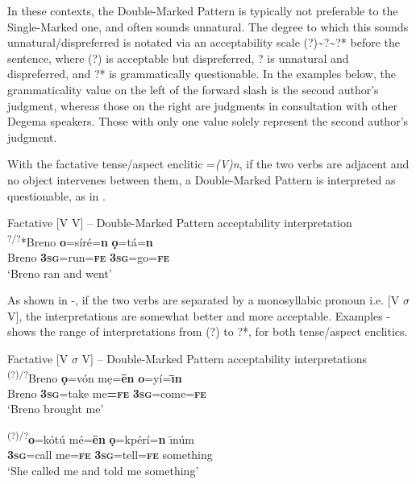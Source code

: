 \documentclass[output=paper]{langsci/langscibook}
\begin{document}
In these contexts, the Double-Marked Pattern is typically not preferable to the Single-Marked one, and often sounds unnatural. The degree to which this sounds unnatural/dispreferred is notated via an acceptability scale (?){\textasciitilde}?{\textasciitilde}?* before the sentence, where (?) is acceptable but dispreferred, ? is unnatural and dispreferred, and ?* is grammatically questionable. In the examples below, the grammaticality value on the left of the forward slash is the second author’s judgment, whereas those on the right are judgments in consultation with other Degema speakers. Those with only one value solely represent the second author’s judgment.

With the factative tense/aspect enclitic =\textit{(V)n}, if the two verbs are adjacent and no object intervenes between them, a Double-Marked Pattern is interpreted as questionable, as in . 

\ea\label{ex:rolle:23}
{Factative [V V] – Double-Marked Pattern acceptability interpretation}\\
\gll  \textsuperscript{?/?}*Breno   \textbf{o}=síré=\textbf{n}     \textbf{ọ}=tá=\textbf{n}\\
     Breno  \textbf{\textsc{3sg}}=run=\textbf{\textsc{fe}}    \textbf{\textsc{3sg}}=go=\textbf{\textsc{fe}}\\
\glt ‘Breno ran and went’
\z

As shown in -, if the two verbs are separated by a monosyllabic pronoun i.e. [V $\sigma $ V], the interpretations are somewhat better and more acceptable. Examples - shows the range of interpretations from (?) to ?*, for both tense/aspect enclitics.



\ea\label{ex:rolle:24}
{Factative [V $\sigma $ V] – Double-Marked Pattern acceptability interpretations} \\
  \ea 
\gll   \textsuperscript{(?)/?}Breno  \textbf{ọ}=vón  mẹ=\textbf{\=en}  \textbf{o}=yí=\textbf{\={\i}n}\\
         Breno  \textbf{\textsc{3}\textsc{sg}}=take  me\textbf{=}\textbf{\textsc{fe}} \textbf{\textsc{3sg}}=come=\textbf{\textsc{fe}}\\
\glt ‘Breno brought me’

\ex\label{ex:rolle:25}
\gll   \textsuperscript{(?)/?}\textbf{o}=kótú    mé=\textbf{\=en}   \textbf{ọ}=kpérí=\textbf{n}   \={\i}núm\\
         \textbf{\textsc{3sg}}=call    me=\textbf{\textsc{fe}} \textbf{\textsc{3sg}}=tell=\textbf{\textsc{fe}}  something\\
\glt ‘She called me and told me something’
\end{document}
